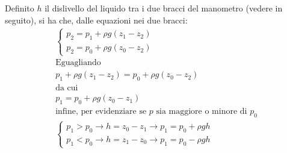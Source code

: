 Definito $h$ il dislivello del liquido tra i due bracci del manometro (vedere in seguito), si ha che, dalle equazioni nei due bracci:
	\begin{equation*}
		\begin{gathered}
			\left\{ 
			\begin{gathered}
				p_2 = p_1 + \rho g (z_1 - z_2) \\ 
				p_2 = p_0 + \rho g (z_0 - z_2) 
			\end{gathered} 
			\right. \\
			\text{Eguagliando}\\
			 p_1 + \rho g (z_1 - z_2) = p_0 + \rho g (z_0 - z_2)\\
			 \text{da cui}\\
			 p_1 = p_0 + \rho g (z_0 - z_1)\\
			 \text{infine, per evidenziare se $p$ sia maggiore o minore di $p_0$}\\
			 \left\{
			 \begin{gathered}
				p_1 > p_0 \rightarrow h = z_0 - z_1 \rightarrow p_1 = p_0 + \rho g h\\ 
				p_1 < p_0 \rightarrow h = z_1 - z_0 \rightarrow p_1 = p_0 - \rho g h
			\end{gathered} 
			\right. \\
		\end{gathered}	
	\end{equation*}
	

